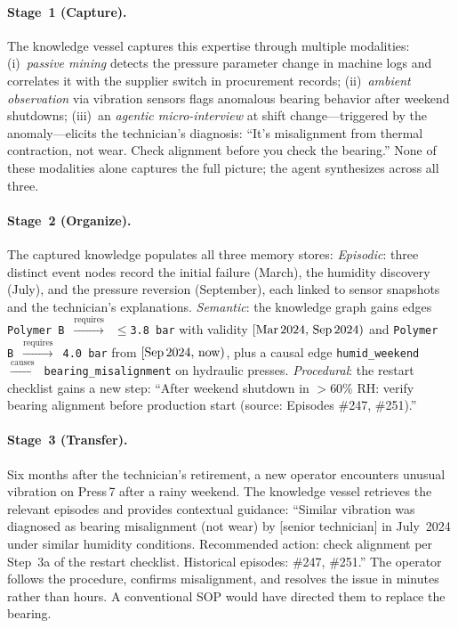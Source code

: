 \documentclass[]{ceurart}
\begin{document}
\paragraph{Stage~1 (Capture).} The knowledge vessel captures this
expertise through multiple modalities: (i)~\emph{passive mining}
detects the pressure parameter change in machine logs and correlates it
with the supplier switch in procurement records; (ii)~\emph{ambient
observation} via vibration sensors flags anomalous bearing behavior
after weekend shutdowns; (iii)~an \emph{agentic micro-interview} at
shift change---triggered by the anomaly---elicits the technician's
diagnosis: ``It's misalignment from thermal contraction, not wear.
Check alignment before you check the bearing.'' None of these modalities
alone captures the full picture; the agent synthesizes across all three.

\paragraph{Stage~2 (Organize).} The captured knowledge populates all
three memory stores:
\emph{Episodic}: three distinct event nodes record the initial failure
(March), the humidity discovery (July), and the pressure reversion
(September), each linked to sensor snapshots and the technician's
explanations.
\emph{Semantic}: the knowledge graph gains edges
\texttt{Polymer\,B}~$\xrightarrow{\text{requires}}$~\texttt{${\leq}$3.8\,bar}
with validity $[\text{Mar\,2024},\,\text{Sep\,2024})$ and
\texttt{Polymer\,B}~$\xrightarrow{\text{requires}}$~\texttt{4.0\,bar}
from $[\text{Sep\,2024},\,\text{now})$, plus a causal edge
\texttt{humid\_weekend}~$\xrightarrow{\text{causes}}$~\texttt{bearing\_misalignment}
on hydraulic presses.
\emph{Procedural}: the restart checklist gains a new step: ``After
weekend shutdown in $>$60\% RH: verify bearing alignment before
production start (source: Episodes \#247, \#251).''

\paragraph{Stage~3 (Transfer).} Six months after the technician's
retirement, a new operator encounters unusual vibration on Press\,7
after a rainy weekend. The knowledge vessel retrieves the relevant
episodes and provides contextual guidance: ``Similar vibration was
diagnosed as bearing misalignment (not wear) by [senior technician]
in July~2024 under similar humidity conditions. Recommended action:
check alignment per Step~3a of the restart checklist. Historical
episodes: \#247, \#251.'' The operator follows the procedure, confirms
misalignment, and resolves the issue in minutes rather than hours. A
conventional SOP would have directed them to replace the bearing.
\end{document}
